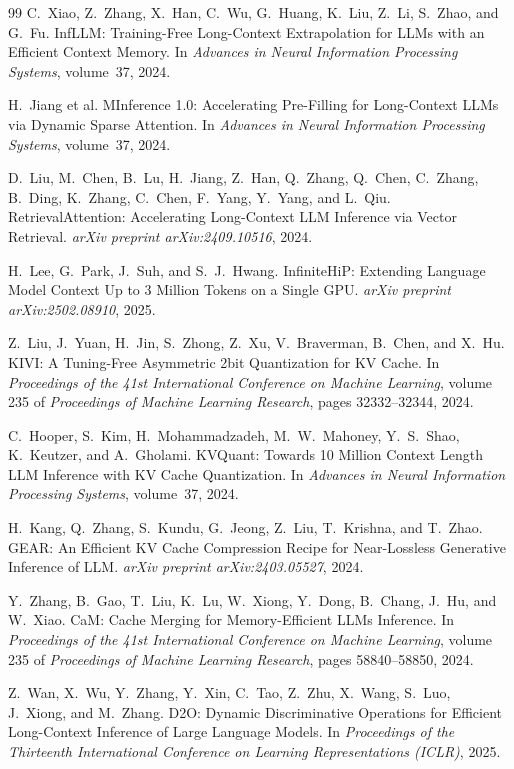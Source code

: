 \documentclass[10pt,twocolumn]{article}
\begin{document}
\begin{thebibliography}{99}
C.~Xiao, Z.~Zhang, X.~Han, C.~Wu, G.~Huang, K.~Liu, Z.~Li,
S.~Zhao, and G.~Fu.
InfLLM: Training-Free Long-Context Extrapolation for LLMs with
an Efficient Context Memory.
In \emph{Advances in Neural Information Processing Systems},
volume~37, 2024.

H.~Jiang et al.
MInference 1.0: Accelerating Pre-Filling for Long-Context LLMs
via Dynamic Sparse Attention.
In \emph{Advances in Neural Information Processing Systems},
volume~37, 2024.

D.~Liu, M.~Chen, B.~Lu, H.~Jiang, Z.~Han, Q.~Zhang, Q.~Chen,
C.~Zhang, B.~Ding, K.~Zhang, C.~Chen, F.~Yang, Y.~Yang, and
L.~Qiu.
RetrievalAttention: Accelerating Long-Context LLM Inference via
Vector Retrieval.
\emph{arXiv preprint arXiv:2409.10516}, 2024.

H.~Lee, G.~Park, J.~Suh, and S.~J.~Hwang.
InfiniteHiP: Extending Language Model Context Up to 3 Million
Tokens on a Single GPU.
\emph{arXiv preprint arXiv:2502.08910}, 2025.

Z.~Liu, J.~Yuan, H.~Jin, S.~Zhong, Z.~Xu, V.~Braverman,
B.~Chen, and X.~Hu.
KIVI: A Tuning-Free Asymmetric 2bit Quantization for KV Cache.
In \emph{Proceedings of the 41st International Conference on
Machine Learning}, volume 235 of \emph{Proceedings of Machine
Learning Research}, pages 32332--32344, 2024.

C.~Hooper, S.~Kim, H.~Mohammadzadeh, M.~W.~Mahoney,
Y.~S.~Shao, K.~Keutzer, and A.~Gholami.
KVQuant: Towards 10 Million Context Length LLM Inference with
KV Cache Quantization.
In \emph{Advances in Neural Information Processing Systems},
volume~37, 2024.

H.~Kang, Q.~Zhang, S.~Kundu, G.~Jeong, Z.~Liu, T.~Krishna,
and T.~Zhao.
GEAR: An Efficient KV Cache Compression Recipe for
Near-Lossless Generative Inference of LLM.
\emph{arXiv preprint arXiv:2403.05527}, 2024.

Y.~Zhang, B.~Gao, T.~Liu, K.~Lu, W.~Xiong, Y.~Dong, B.~Chang,
J.~Hu, and W.~Xiao.
CaM: Cache Merging for Memory-Efficient LLMs Inference.
In \emph{Proceedings of the 41st International Conference on
Machine Learning}, volume 235 of \emph{Proceedings of Machine
Learning Research}, pages 58840--58850, 2024.

Z.~Wan, X.~Wu, Y.~Zhang, Y.~Xin, C.~Tao, Z.~Zhu, X.~Wang,
S.~Luo, J.~Xiong, and M.~Zhang.
D2O: Dynamic Discriminative Operations for Efficient
Long-Context Inference of Large Language Models.
In \emph{Proceedings of the Thirteenth International Conference
on Learning Representations (ICLR)}, 2025.


\end{thebibliography}
\end{document}
